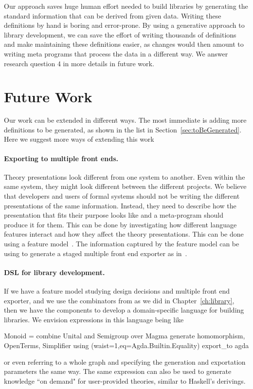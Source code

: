 Our approach saves huge human effort needed to build libraries by generating the standard information that can be derived from given data. Writing these definitions by hand is boring and error-prone. By using a generative approach to library development, we can save the effort of writing thousands of definitions and make maintaining these definitions easier, as changes would then amount to writing meta programs that process the data in a different way. We answer research question 4 in more details in future work. 


\section{Future Work}
\label{future_work}
Our work can be extended in different ways. The most immediate is adding more definitions to be generated, as shown in the list in Section~\ref{sec:toBeGenerated}. Here we suggest more ways of extending this work 

\paragraph{Exporting to multiple front ends.} Theory presentations look different from one system to another. Even within the same system, they might look different between the different projects. We believe that developers and users of formal systems should not be writing the different presentations of the same information. Instead, they need to describe how the presentation that fits their purpose looks like and a meta-program should produce it for them. This can be done by investigating how different language features interact and how they affect the theory presentations. This can be done using a feature model~\cite{czarnecki2000generative}. The information captured by the feature model can be using to generate a staged multiple front end exporter as in~\cite{stagedConfig}. 

\paragraph{DSL for library development.}
If we have a feature model studying design decisions and multiple front end exporter, and we use the combinators from \cite{carette2018building} as we did in Chapter~\ref{ch:library}, then we have the components to develop a domain-specific language for building libraries. We envision expressions in this language being like
\begin{togcode}
Monoid = combine Unital and Semigroup over Magma
         generate homomorphism, OpenTerms, Simplifier
         using (waist=1,eq=Agda.Builtin.Equality)
         export_to agda 
\end{togcode} 
\noindent or even referring to a whole graph and specifying the generation and exportation parameters the same way. 
The same expression can also be used to generate knowledge ``on demand" for user-provided theories, similar to Haskell's derivings. 

